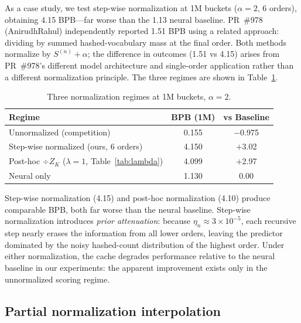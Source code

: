 \documentclass[11pt]{article}
\begin{document}
As a case study, we test step-wise normalization at 1M buckets ($\alpha = 2$, 6 orders), obtaining 4.15 BPB---far worse than the 1.13 neural baseline. PR~\#978 (AnirudhRahul) independently reported 1.51 BPB using a related approach: dividing by summed hashed-vocabulary mass at the final order. Both methods normalize by $S^{(n)} + \alpha$; the difference in outcomes (1.51 vs 4.15) arises from PR~\#978's different model architecture and single-order application rather than a different normalization principle. The three regimes are shown in Table~\ref{tab:three_regimes}.

\begin{table}[h]
\centering
\caption{Three normalization regimes at 1M buckets, $\alpha = 2$.}
\label{tab:three_regimes}
\begin{tabular}{lcc}
\toprule
Regime & BPB (1M) & vs Baseline \\
\midrule
Unnormalized (competition) & 0.155 & $-$0.975 \\
Step-wise normalized (ours, 6 orders) & 4.150 & $+$3.02 \\
Post-hoc $\div Z_K$ ($\lambda = 1$, Table~\ref{tab:lambda}) & 4.099 & $+$2.97 \\
Neural only & 1.130 & 0.00 \\
\bottomrule
\end{tabular}
\end{table}

Step-wise normalization (4.15) and post-hoc normalization (4.10) produce comparable BPB, both far worse than the neural baseline. Step-wise normalization introduces \emph{prior attenuation}: because $\eta_n \approx 3 \times 10^{-5}$, each recursive step nearly erases the information from all lower orders, leaving the predictor dominated by the noisy hashed-count distribution of the highest order. Under either normalization, the cache degrades performance relative to the neural baseline in our experiments: the apparent improvement exists only in the unnormalized scoring regime.

\subsection{Partial normalization interpolation}
\label{sec:lambda}
\end{document}
